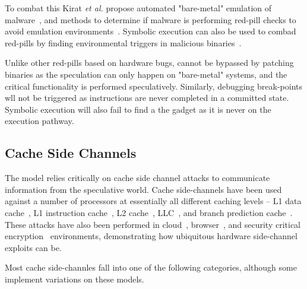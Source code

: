 To combat this Kirat \textit{et al.} propose automated "bare-metal" 
emulation of malware~\cite{kirat2011barebox}, and methods to determine if malware
is performing red-pill checks to avoid emulation environments~\cite{kirat2014barecloud}.
Symbolic execution can also be used to combad red-pills by finding environmental triggers 
in malicious binaries~\cite{schwartz2010all}. 

\smallskip

Unlike other red-pills based on hardware bugs, \speculake cannot be bypassed
by patching binaries as the speculation can only happen on "bare-metal" systems, 
and the critical functionality is performed speculatively. Similarly, debugging 
break-points wll not be triggered as instructions are never completed in a committed state.
Symbolic execution will also fail to find a the gadget as it is never on the 
execution pathway. 



\subsection{Cache Side Channels}

The \speculake model relies critically on cache side channel attacks to 
communicate information from the speculative world. Cache side-channels have 
been used against a number of processors at essentially all different 
caching levels -- L1 data cache~\cite{percival2005cache,zhang2012cross,osvik2006cache}, 
L1 instruction cache~\cite{aciiccmez2010new}, 
L2 cache~\cite{ristenpart2009hey,percival2005cache}, 
LLC~\cite{ristenpart2009hey,liu2015last}, 
and branch prediction cache~\cite{aciiccmez2007power}. 
These attacks have also been performed in 
cloud~\cite{ristenpart2009hey,zhang2012cross}, 
browser~\cite{oren2015spy,google_cache_browser},
and security critical encryption~\cite{yarom2014recovering,tromer2010efficient}
environments, demonstrating how ubiquitous hardware side-channel exploits can be. 

Most cache side-channles fall into one of the following categories, although
some implement variations on these models.

